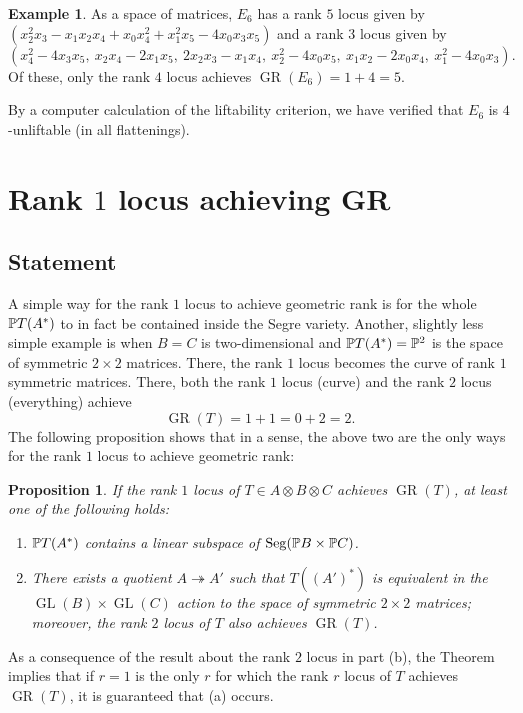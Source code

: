 \documentclass[a4paper,10pt]{article}
\let\surjto\twoheadrightarrow
\DeclareMathOperator{\Seg}{Seg}
\DeclareMathOperator{\GR}{GR}
\DeclareMathOperator{\GL}{GL}
\newtheorem{prop}[theorem]{Proposition}
\theoremstyle{definition}
\newtheorem{example}[theorem]{Example}
\theoremstyle{remark}
\begin{document}
\begin{example}
As a space of matrices, $E_6$ has a rank $5$ locus given by $(x_2^2x_3 - x_1x_2x_4 + x_0x_4^2 + x_1^2x_5 - 4x_0x_3x_5)$ and a rank $3$ locus given by
\[
    (x_4^2 - 4x_3x_5,\ x_2x_4 - 2x_1x_5,\ 2x_2x_3 - x_1x_4,\ x_2^2 - 4x_0x_5,\ x_1x_2 - 2x_0x_4,\ x_1^2 - 4x_0x_3).
\]
Of these, only the rank $4$ locus achieves $\GR(E_6) = 1+4 = 5$.

By a computer calculation of the liftability criterion, we have verified that $E_6$ is $4$-unliftable (in all flattenings).
\end{example}

























\section{Rank $1$ locus achieving GR}
\label{sec:rank-one-degeneracies}

\subsection{Statement}

A simple way for the rank $1$ locus to achieve geometric rank is for the whole $\pe T(A^*)$ to in fact be contained inside the Segre variety. Another, slightly less simple example is when $B=C$ is two-dimensional and $\pe T(A^*)=\pe^2$ is the space of symmetric $2\times2$ matrices. There, the rank $1$ locus becomes the curve of rank $1$ symmetric matrices. There, both the rank $1$ locus (curve) and the rank $2$ locus (everything) achieve
\[
    \GR(T) = 1+1 = 0+2 = 2.
\]
The following proposition shows that in a sense, the above two are the only ways for the rank $1$ locus to achieve geometric rank:

\begin{prop}
    \label{prp:pawel}
    If the rank $1$ locus of $T\in A\otimes B\otimes C$ achieves $\GR(T)$, at least one of the following holds:
    \begin{enumerate}[label={\textup{(\alph*)}}]
        \item $\pe T(A^*)$ contains a linear subspace of $\Seg(\pe B\times\pe C)$.
        \item There exists a quotient $A\surjto A'$ such that $T((A')^*)$ is equivalent in the $\GL(B)\times\GL(C)$ action to the space of symmetric $2\times 2$ matrices; moreover, the rank $2$ locus of $T$ also achieves $\GR(T)$.
    \end{enumerate}
\end{prop}
As a consequence of the result about the rank $2$ locus in part (b), the Theorem implies that if $r=1$ is the only $r$ for which the rank $r$ locus of $T$ achieves $\GR(T)$, it is guaranteed that (a) occurs.
\end{document}
